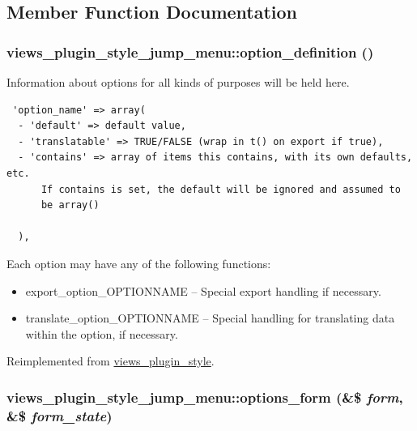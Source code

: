 \subsection{Member Function Documentation}
\hypertarget{classviews__plugin__style__jump__menu_6e27e595ed6a3115705f13b76367b637}{
\subsubsection[{option\_\-definition}]{\setlength{\rightskip}{0pt plus 5cm}views\_\-plugin\_\-style\_\-jump\_\-menu::option\_\-definition ()}}
\label{classviews__plugin__style__jump__menu_6e27e595ed6a3115705f13b76367b637}


Information about options for all kinds of purposes will be held here. 

\begin{Code}\begin{verbatim} 'option_name' => array(
  - 'default' => default value,
  - 'translatable' => TRUE/FALSE (wrap in t() on export if true),
  - 'contains' => array of items this contains, with its own defaults, etc.
      If contains is set, the default will be ignored and assumed to
      be array()

  ),
\end{verbatim}
\end{Code}

 Each option may have any of the following functions:\begin{itemize}
\item export\_\-option\_\-OPTIONNAME -- Special export handling if necessary.\item translate\_\-option\_\-OPTIONNAME -- Special handling for translating data within the option, if necessary. \end{itemize}


Reimplemented from \hyperlink{classviews__plugin__style_95b6f2eadf403ff36f1ff2860294b3c2}{views\_\-plugin\_\-style}.\hypertarget{classviews__plugin__style__jump__menu_d7158f1d70c97809b44bfa0e10b11709}{
\subsubsection[{options\_\-form}]{\setlength{\rightskip}{0pt plus 5cm}views\_\-plugin\_\-style\_\-jump\_\-menu::options\_\-form (\&\$ {\em form}, \/  \&\$ {\em form\_\-state})}}
\label{classviews__plugin__style__jump__menu_d7158f1d70c97809b44bfa0e10b11709}


